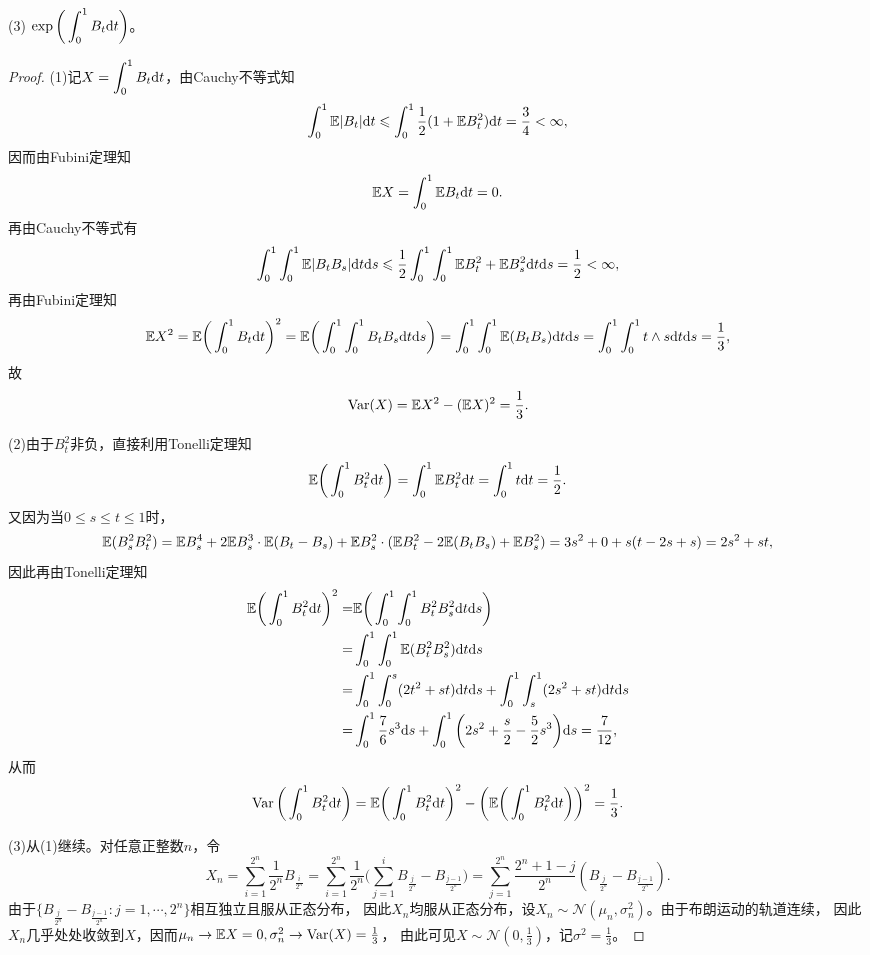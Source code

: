 \begin{enumerate}
    (3) $\exp\bigg(\displaystyle\int_0^1B_t{\rm d}t\bigg)$。
    \begin{proof}
        (1)记$X=\displaystyle\int_0^1B_t{\rm d}t$，由Cauchy不等式知
        \[\int_0^1\mathbb{E}|B_t|{\rm d}t\leqslant\int_0^1\frac{1}{2}(1+\mathbb{E} B_t^2){\rm d}t=\frac{3}{4}<\infty,\]
        因而由Fubini定理知\[\mathbb{E} X=\int_0^1\mathbb{E} B_t{\rm d}t=0.\]
        再由Cauchy不等式有\[\int_0^1\int_0^1\mathbb{E}|B_tB_s|{\rm d}t{\rm d}s\leqslant
        \frac{1}{2}\int_0^1\int_0^1\mathbb{E} B_t^2+\mathbb{E} B_s^2{\rm d}t{\rm d}s=\frac{1}{2}<\infty,\]
        再由Fubini定理知\[\mathbb{E} X^2=\mathbb{E}\bigg(\int_0^1 B_t{\rm d}t\bigg)^2=
        \mathbb{E}\bigg(\int_0^1\int_0^1B_tB_s{\rm d}t{\rm d}s\bigg)=\int_0^1\int_0^1\mathbb{E}(B_tB_s){\rm d}t{\rm d}s
        =\int_0^1\int_0^1t\land s{\rm d}t{\rm d}s=\frac{1}{3},\]
        故\[\operatorname{Var}(X)=\mathbb{E} X^2-(\mathbb{E} X)^2=\frac{1}{3}.\]
        
        (2)由于$B_t^2$非负，直接利用Tonelli定理知
        \[\mathbb{E}\bigg(\int_0^1B_t^2{\rm d}t\bigg)=\int_0^1\mathbb{E} B_t^2{\rm d}t=\int_0^1t{\rm d}t=\frac{1}{2}.\]
        又因为当$0\leqslant s\leqslant t\leqslant1$时，
        \[\mathbb{E}(B_s^2B_t^2)=\mathbb{E} B_s^4+2\mathbb{E} B_s^3\cdot\mathbb{E}(B_t-B_s)+\mathbb{E} B_s^2\cdot(\mathbb{E} B_t^2-2\mathbb{E}(B_tB_s)+\mathbb{E} B_s^2)
        =3s^2+0+s(t-2s+s)=2s^2+st,\]
        因此再由Tonelli定理知
        \begin{align*}
            \mathbb{E}\bigg(\int_0^1B_t^2{\rm d}t\bigg)^2=&\mathbb{E}\bigg(\int_0^1\int_0^1B_t^2B_s^2{\rm d}t{\rm d}s\bigg)\\
            =&\int_0^1\int_0^1\mathbb{E}(B_t^2B_s^2){\rm d}t{\rm d}s\\
            =&\int_0^1\int_0^s(2t^2+st){\rm d}t{\rm d}s+\int_0^1\int_s^1(2s^2+st){\rm d}t{\rm d}s\\
            =&\int_0^1\frac{7}{6}s^3{\rm d}s+\int_0^1\bigg(2s^2+\frac{s}{2}-\frac{5}{2}s^3\bigg){\rm d}s=\frac{7}{12},
        \end{align*}
        从而\[\operatorname{Var}\bigg(\int_0^1B_t^2{\rm d}t\bigg)=\mathbb{E}\bigg(\int_0^1B_t^2{\rm d}t\bigg)^2
        -\bigg(\mathbb{E}\bigg(\int_0^1B_t^2{\rm d}t\bigg)\bigg)^2=\frac{1}{3}.\]

        (3)从(1)继续。对任意正整数$n$，令\[X_n=\sum_{i=1}^{2^n}\frac{1}{2^n}B_{\frac{i}{2^n}}=
        \sum_{i=1}^{2^n}\frac{1}{2^n}\bigg(\sum_{j=1}^iB_{\frac{j}{2^n}}-B_{\frac{j-1}{2^n}}\bigg)
        =\sum_{j=1}^{2^n}\frac{2^n+1-j}{2^n}(B_{\frac{j}{2^n}}-B_{\frac{j-1}{2^n}}).\]
        由于$\{B_{\frac{j}{2^n}}-B_{\frac{j-1}{2^n}}:j=1,\cdots,2^n\}$相互独立且服从正态分布，
        因此$X_n$均服从正态分布，设$X_n\sim\mathcal{N}(\mu_n,\sigma_n^2)$。由于布朗运动的轨道连续，
        因此$X_n$几乎处处收敛到$X$，因而$\mu_n\to\mathbb{E} X=0,\sigma_n^2\to\operatorname{Var}(X)=\frac{1}{3}$，
        由此可见$X\sim\mathcal{N}(0,\frac{1}{3})$，记$\sigma^2=\frac{1}{3}$。


\end{proof}
\end{enumerate}
